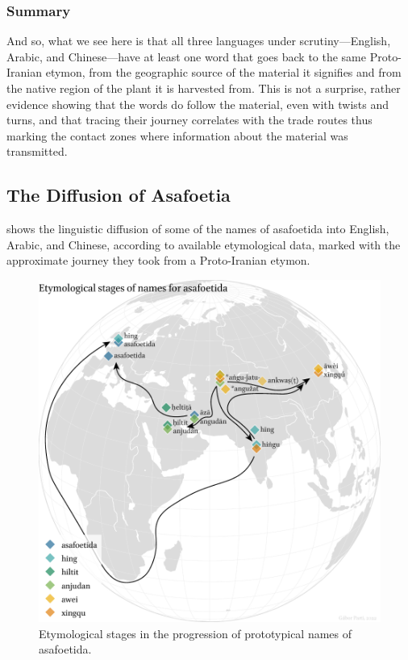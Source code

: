 


\subsubsection{Summary}

And so, what we see here is that all three languages under scrutiny---English, Arabic, and Chinese---have at least one word that goes back to the same Proto-Iranian etymon, from the geographic source of the material it signifies and from the native region of the plant it is harvested from. This is not a surprise, rather evidence showing that the words do follow the material, even with twists and turns, and that tracing their journey correlates with the trade routes thus marking the contact zones where information about the material was transmitted.



\subsection{The Diffusion of Asafoetia}

 shows the linguistic diffusion of some of the names of asafoetida into English, Arabic, and Chinese, according to available etymological data, marked with the approximate journey they took from a Proto-Iranian etymon.

\begin{figure}[ht]
    \centering
    \includegraphics[width=\textwidth]{imgs/plots/diffusion_asafoetida_edited.pdf}
    \caption{Etymological stages in the progression of prototypical names of asafoetida.}
    \label{fig:asafoetida_diffusion}
\end{figure}

